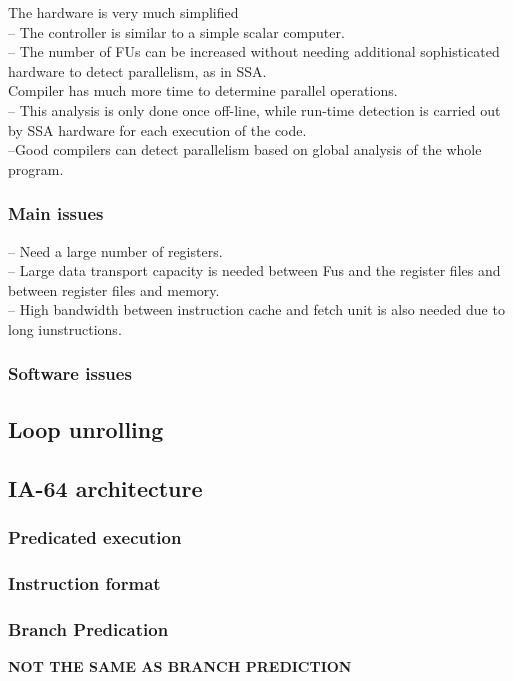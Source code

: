 \documentclass[titlepage, a4paper]{article}
\begin{document}
The hardware is very much simplified \\
-- The controller is similar to a simple scalar computer. \\
-- The number of FUs can be increased without needing additional sophisticated hardware to detect parallelism, as in SSA. \\

Compiler has much more time to determine parallel operations. \\
-- This analysis is only done once off-line, while run-time detection is carried out by SSA hardware for each execution of the code. \\
--Good compilers can detect parallelism based on global analysis of the whole program. \\

\subsubsection{Main issues}
-- Need a large number of registers. \\
-- Large data transport capacity is needed between Fus and the register files and between register files and memory. \\
-- High bandwidth between instruction cache and fetch unit is also needed due to long iunstructions.

\subsubsection{Software issues}

\subsection{Loop unrolling}

\subsection{IA-64 architecture}
\subsubsection{Predicated execution}
\subsubsection{Instruction format}
\subsubsection{Branch Predication}
\textbf{NOT THE SAME AS BRANCH PREDICTION}
\end{document}
